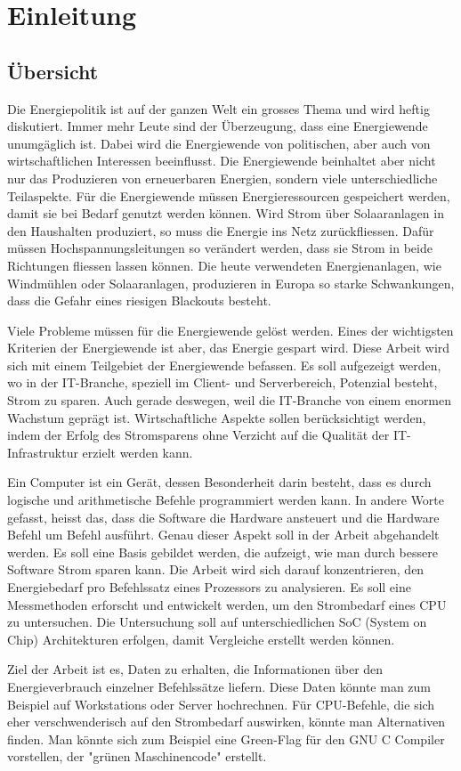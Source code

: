 \chapter{Einleitung}

\section{Übersicht}

Die Energiepolitik ist auf der ganzen Welt ein grosses Thema und wird heftig diskutiert. Immer mehr Leute
sind der Überzeugung, dass eine Energiewende unumgäglich ist. Dabei wird die Energiewende von politischen, aber auch
von wirtschaftlichen Interessen beeinflusst. Die Energiewende beinhaltet aber nicht nur
das Produzieren von erneuerbaren Energien, sondern viele unterschiedliche Teilaspekte. Für die Energiewende
müssen Energieressourcen gespeichert werden, damit sie bei Bedarf genutzt werden können. Wird Strom über
Solaaranlagen in den Haushalten produziert, so muss die Energie ins Netz zurückfliessen. Dafür müssen
Hochspannungsleitungen so verändert werden, dass sie Strom in beide Richtungen fliessen lassen können.
Die heute verwendeten Energienanlagen, wie Windmühlen oder Solaaranlagen, produzieren in Europa so starke
Schwankungen, dass die Gefahr eines riesigen Blackouts besteht.
\par
Viele Probleme müssen für die Energiewende gelöst werden. Eines der wichtigsten Kriterien der Energiewende ist aber,
das Energie gespart wird. Diese Arbeit wird sich mit einem Teilgebiet der Energiewende befassen.
Es soll aufgezeigt werden, wo in der IT-Branche, speziell im Client- und Serverbereich, Potenzial besteht,
Strom zu sparen. Auch gerade deswegen, weil die IT-Branche von einem enormen Wachstum geprägt ist. Wirtschaftliche Aspekte sollen
berücksichtigt werden, indem der Erfolg des Stromsparens ohne Verzicht auf die Qualität der IT-Infrastruktur erzielt
werden kann. 
\par
Ein Computer ist ein Gerät, dessen Besonderheit darin besteht, dass es durch logische und arithmetische Befehle programmiert
werden kann. In andere Worte gefasst, heisst das, dass die Software die Hardware ansteuert und die Hardware Befehl um Befehl ausführt.
Genau dieser Aspekt soll in der Arbeit abgehandelt werden. Es soll eine Basis gebildet werden, die aufzeigt, wie man durch bessere Software Strom
sparen kann. Die Arbeit wird sich darauf konzentrieren, den Energiebedarf pro Befehlssatz eines Prozessors zu analysieren.
Es soll eine Messmethoden erforscht und entwickelt werden, um den Strombedarf eines CPU zu untersuchen. Die Untersuchung soll
auf unterschiedlichen SoC (System on Chip) Architekturen erfolgen, damit Vergleiche erstellt werden können.
\par
Ziel der Arbeit ist es, Daten zu erhalten, die Informationen über den Energieverbrauch einzelner Befehlssätze liefern. Diese Daten
könnte man zum Beispiel auf Workstations oder Server hochrechnen. Für CPU-Befehle, die sich eher verschwenderisch auf den
Strombedarf auswirken, könnte man Alternativen finden. Man könnte sich zum Beispiel eine Green-Flag für den GNU C Compiler
vorstellen, der "grünen Maschinencode" erstellt.




